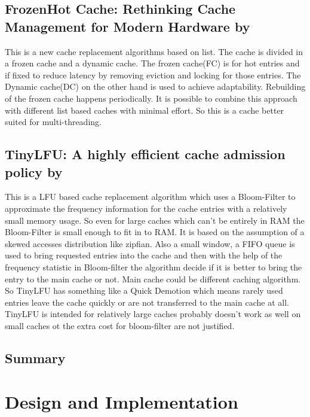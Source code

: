 \documentclass[
	12pt,
	a4paper,
	abstract,
	bibliography=totoc,
	chapterprefix,
	headings=openright,
	numbers=endperiod,
	parskip=half,
	twoside,
]{scrreprt}
\begin{document}
\section*{FrozenHot Cache: Rethinking Cache Management for Modern Hardware by \cite{qiu2023frozenhot}}

This is a new cache replacement algorithms based on list.
The cache is divided in a frozen cache and a dynamic cache.
The frozen cache(FC) is for hot entries and if fixed to reduce latency by removing eviction and locking for those entries. 
The Dynamic cache(DC) on the other hand is used to achieve adaptability.
Rebuilding of the frozen cache happens periodically.
It is possible to combine this approach with different list based caches with minimal effort.
So this is a cache better suited for multi-threading.

\section*{TinyLFU: A highly efficient cache admission policy by \cite{einziger2017tinylfu}}

This is a LFU based cache replacement algorithm which uses a Bloom-Filter to approximate the frequency information for the cache entries with a relatively small memory usage.
So even for large caches which can't be entirely in RAM the Bloom-Filter is small enough to fit in to RAM.
It is based on the assumption of a skewed accesses distribution like zipfian.
Also a small window, a FIFO queue is used to bring requested entries into the cache and then
with the help of the frequency statistic in Bloom-filter the algorithm decide if it is better to bring the entry to the main cache or not. Main cache could be different caching algorithm.
So TinyLFU has something like a Quick Demotion which means rarely used entries leave the cache quickly or are not transferred to the main cache at all.
TinyLFU is intended for relatively large caches probably doesn't work as well on small caches ot the extra cost for bloom-filter are not justified.


\section*{Summary}

\chapter{Design and Implementation}
\label{cha:design and implementation}
\end{document}
